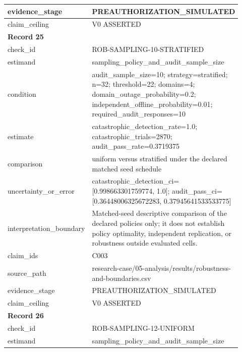 \begin{longtable}{|p{0.24\linewidth}|p{0.68\linewidth}|}
evidence\_\allowbreak{}stage & PREAUTHORIZATION\_\allowbreak{}SIMULATED \\ \hline
claim\_\allowbreak{}ceiling & V0 ASSERTED \\ \hline
\multicolumn{2}{|l|}{\textbf{Record 25}} \\ \hline
check\_\allowbreak{}id & ROB-SAMPLING-10-STRATIFIED \\ \hline
estimand & sampling\_\allowbreak{}policy\_\allowbreak{}and\_\allowbreak{}audit\_\allowbreak{}sample\_\allowbreak{}size \\ \hline
condition & audit\_\allowbreak{}sample\_\allowbreak{}size=10;\allowbreak{} strategy=stratified;\allowbreak{} n=32;\allowbreak{} threshold=22;\allowbreak{} domains=4;\allowbreak{} domain\_\allowbreak{}outage\_\allowbreak{}probability=0.2;\allowbreak{} independent\_\allowbreak{}offline\_\allowbreak{}probability=0.01;\allowbreak{} required\_\allowbreak{}audit\_\allowbreak{}responses=10 \\ \hline
estimate & catastrophic\_\allowbreak{}detection\_\allowbreak{}rate=1.0;\allowbreak{} catastrophic\_\allowbreak{}trials=2870;\allowbreak{} audit\_\allowbreak{}pass\_\allowbreak{}rate=0.3719375 \\ \hline
comparison & uniform versus stratified under the declared matched seed schedule \\ \hline
uncertainty\_\allowbreak{}or\_\allowbreak{}error & catastrophic\_\allowbreak{}detection\_\allowbreak{}ci=[0.998663301759774, 1.0];\allowbreak{} audit\_\allowbreak{}pass\_\allowbreak{}ci=[0.36448006325672283, 0.37945641533533775] \\ \hline
interpretation\_\allowbreak{}boundary & Matched-seed descriptive comparison of the declared policies only;\allowbreak{} it does not establish policy optimality, independent replication, or robustness outside evaluated cells. \\ \hline
claim\_\allowbreak{}ids & C003 \\ \hline
source\_\allowbreak{}path & research-case/05-analysis/results/robustness-and-boundaries.csv \\ \hline
evidence\_\allowbreak{}stage & PREAUTHORIZATION\_\allowbreak{}SIMULATED \\ \hline
claim\_\allowbreak{}ceiling & V0 ASSERTED \\ \hline
\multicolumn{2}{|l|}{\textbf{Record 26}} \\ \hline
check\_\allowbreak{}id & ROB-SAMPLING-12-UNIFORM \\ \hline
estimand & sampling\_\allowbreak{}policy\_\allowbreak{}and\_\allowbreak{}audit\_\allowbreak{}sample\_\allowbreak{}size \\ \hline

\end{longtable}
